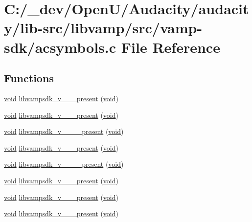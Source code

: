\hypertarget{vamp-sdk_2acsymbols_8c}{}\section{C\+:/\+\_\+dev/\+Open\+U/\+Audacity/audacity/lib-\/src/libvamp/src/vamp-\/sdk/acsymbols.c File Reference}
\label{vamp-sdk_2acsymbols_8c}
\subsection*{Functions}
\begin{DoxyCompactItemize}
\item 
\hyperlink{sound_8c_ae35f5844602719cf66324f4de2a658b3}{void} \hyperlink{vamp-sdk_2acsymbols_8c_a25c8853023db5c164505af9979e45d41}{libvampsdk\+\_\+v\+\_\+\_\+\_\+present} (\hyperlink{sound_8c_ae35f5844602719cf66324f4de2a658b3}{void})
\item 
\hyperlink{sound_8c_ae35f5844602719cf66324f4de2a658b3}{void} \hyperlink{vamp-sdk_2acsymbols_8c_ad85bdc5b74d5d07b3a19ba1338dd77de}{libvampsdk\+\_\+v\+\_\+\_\+\_\+present} (\hyperlink{sound_8c_ae35f5844602719cf66324f4de2a658b3}{void})
\item 
\hyperlink{sound_8c_ae35f5844602719cf66324f4de2a658b3}{void} \hyperlink{vamp-sdk_2acsymbols_8c_a22bdb3c5dfcc92935043eb961be2bdf0}{libvampsdk\+\_\+v\+\_\+\_\+\_\+\_\+present} (\hyperlink{sound_8c_ae35f5844602719cf66324f4de2a658b3}{void})
\item 
\hyperlink{sound_8c_ae35f5844602719cf66324f4de2a658b3}{void} \hyperlink{vamp-sdk_2acsymbols_8c_a5a0f1052c37acfcc9821c041dd9cd173}{libvampsdk\+\_\+v\+\_\+\_\+\_\+present} (\hyperlink{sound_8c_ae35f5844602719cf66324f4de2a658b3}{void})
\item 
\hyperlink{sound_8c_ae35f5844602719cf66324f4de2a658b3}{void} \hyperlink{vamp-sdk_2acsymbols_8c_a483bd10d97a55c417ec466b5d34273ca}{libvampsdk\+\_\+v\+\_\+\_\+\_\+\_\+present} (\hyperlink{sound_8c_ae35f5844602719cf66324f4de2a658b3}{void})
\item 
\hyperlink{sound_8c_ae35f5844602719cf66324f4de2a658b3}{void} \hyperlink{vamp-sdk_2acsymbols_8c_a2b6409ca687ef011687570407c7efc15}{libvampsdk\+\_\+v\+\_\+\_\+\_\+present} (\hyperlink{sound_8c_ae35f5844602719cf66324f4de2a658b3}{void})
\item 
\hyperlink{sound_8c_ae35f5844602719cf66324f4de2a658b3}{void} \hyperlink{vamp-sdk_2acsymbols_8c_acc15a7f9e9dec0ba0d1f0a7bf9364e6f}{libvampsdk\+\_\+v\+\_\+\_\+\_\+present} (\hyperlink{sound_8c_ae35f5844602719cf66324f4de2a658b3}{void})
\item 
\hyperlink{sound_8c_ae35f5844602719cf66324f4de2a658b3}{void} \hyperlink{vamp-sdk_2acsymbols_8c_a370b01ace7ee68dadc6ccf34321035c0}{libvampsdk\+\_\+v\+\_\+\_\+\_\+present} (\hyperlink{sound_8c_ae35f5844602719cf66324f4de2a658b3}{void})
\end{DoxyCompactItemize}


